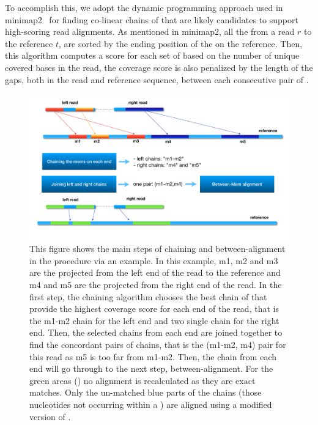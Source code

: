 To accomplish this, we adopt the dynamic programming approach used in
minimap2~\citep{minimap2} for finding co-linear chains of \mems that
are likely candidates to support high-scoring read alignments. As
mentioned in minimap2, all the \mems from a read $r$ to the reference
$t$, are sorted by the ending position of the \mems on the reference.
Then, this algorithm computes a score for each set of \mems
based on the number of unique covered bases in the read, the coverage
score is also penalized by the length of the gaps, both in the read
and reference sequence, between each consecutive pair of \mems.

\begin{figure}[H]
    \centering
    \includegraphics[width=0.95\columnwidth, trim={0in 0in 0in 0in},clip]{Figures/puff/MainFig.pdf}
    \caption[Main steps of chaining and between-\mem alignment in the \puffaligner]
    {This figure shows the main steps of chaining and
    between-\mem alignment in the \puffaligner procedure via an
    example. In this example, m1, m2 and m3 are the projected \mems
    from the left end of the read to the reference and m4 and m5 are
    the projected \mems from the right end of the read. In the first
    step, the chaining algorithm chooses the best chain of \mems that
    provide the highest coverage score for each end of the read, that
    is the m1-m2 chain for the left end and two single \mem chain for
    the right end. Then, the selected chains from each end are joined
    together to find the concordant pairs of chains, that is the
    (m1-m2, m4) pair for this read as m5 is too far from m1-m2. Then,
    the chain from each end will go through to the next step,
    between-\mem alignment. For the green areas (\mems) no alignment
    is recalculated as they are exact matches. Only the un-matched
    blue parts of the chains (those nucleotides not occurring within
    a \mem) are aligned using a modified version of \ksw. }
    \label{fig:mainScheme}
\end{figure}

